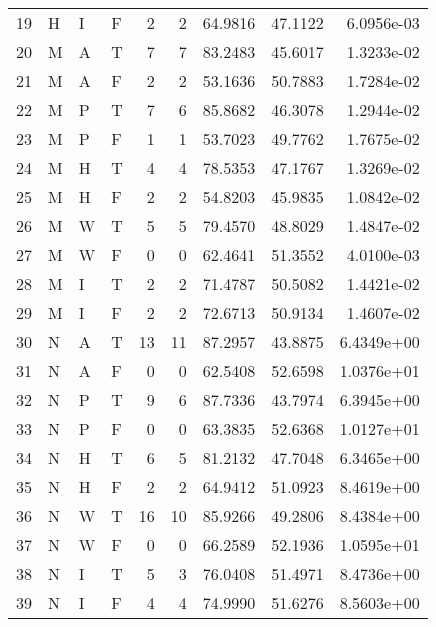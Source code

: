 \begin{tabular}{rlllrrrrr}
    19 & H     & I     & F          & 2    & 2     & 64.9816    & 47.1122  & 6.0956e-03 \\
    20 & M     & A     & T          & 7    & 7     & 83.2483    & 45.6017  & 1.3233e-02 \\
    21 & M     & A     & F          & 2    & 2     & 53.1636    & 50.7883  & 1.7284e-02 \\
    22 & M     & P     & T          & 7    & 6     & 85.8682    & 46.3078  & 1.2944e-02 \\
    23 & M     & P     & F          & 1    & 1     & 53.7023    & 49.7762  & 1.7675e-02 \\
    24 & M     & H     & T          & 4    & 4     & 78.5353    & 47.1767  & 1.3269e-02 \\
    25 & M     & H     & F          & 2    & 2     & 54.8203    & 45.9835  & 1.0842e-02 \\
    26 & M     & W     & T          & 5    & 5     & 79.4570    & 48.8029  & 1.4847e-02 \\
    27 & M     & W     & F          & 0    & 0     & 62.4641    & 51.3552  & 4.0100e-03 \\
    28 & M     & I     & T          & 2    & 2     & 71.4787    & 50.5082  & 1.4421e-02 \\
    29 & M     & I     & F          & 2    & 2     & 72.6713    & 50.9134  & 1.4607e-02 \\
    30 & N     & A     & T          & 13   & 11    & 87.2957    & 43.8875  & 6.4349e+00 \\
    31 & N     & A     & F          & 0    & 0     & 62.5408    & 52.6598  & 1.0376e+01 \\
    32 & N     & P     & T          & 9    & 6     & 87.7336    & 43.7974  & 6.3945e+00 \\
    33 & N     & P     & F          & 0    & 0     & 63.3835    & 52.6368  & 1.0127e+01 \\
    34 & N     & H     & T          & 6    & 5     & 81.2132    & 47.7048  & 6.3465e+00 \\
    35 & N     & H     & F          & 2    & 2     & 64.9412    & 51.0923  & 8.4619e+00 \\
    36 & N     & W     & T          & 16   & 10    & 85.9266    & 49.2806  & 8.4384e+00 \\
    37 & N     & W     & F          & 0    & 0     & 66.2589    & 52.1936  & 1.0595e+01 \\
    38 & N     & I     & T          & 5    & 3     & 76.0408    & 51.4971  & 8.4736e+00 \\
    39 & N     & I     & F          & 4    & 4     & 74.9990    & 51.6276  & 8.5603e+00 \\
    \hline
\end{tabular}